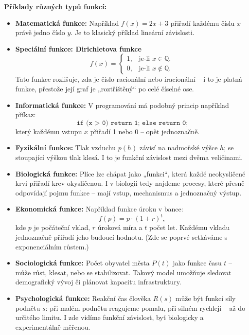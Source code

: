 \documentclass[12pt,a4paper]{article}
\begin{document}
\begin{examplebox}
\textbf{Příklady různých typů funkcí:}
\begin{itemize}
  \item \textbf{Matematická funkce:}  
  Například \(f(x) = 2x + 3\) přiřadí každému číslu \(x\) právě jedno číslo \(y\).  
  Je to klasický příklad lineární závislosti.

  \item \textbf{Speciální funkce: Dirichletova funkce}  
  \[
  f(x) = 
  \begin{cases}
  1, & \text{je-li } x \in \mathbb{Q},\\
  0, & \text{je-li } x \notin \mathbb{Q}.
  \end{cases}
  \]
  Tato funkce rozlišuje, zda je číslo racionální nebo iracionální – i to je platná funkce, přestože její graf je „roztříštěný“ po celé číselné ose.

  \item \textbf{Informatická funkce:}  
  V programování má podobný princip například příkaz:
  \[
  \texttt{if (x > 0) return 1; else return 0;}
  \]
  který každému vstupu \(x\) přiřadí 1 nebo 0 – opět jednoznačně.

  \item \textbf{Fyzikální funkce:}  
  Tlak vzduchu \(p(h)\) závisí na nadmořské výšce \(h\); se stoupající výškou tlak klesá.  
  I to je funkční závislost mezi dvěma veličinami.

  \item \textbf{Biologická funkce:}  
  Plíce lze chápat jako „funkci“, která každé neokysličené krvi přiřadí krev okysličenou.  
  I v biologii tedy najdeme procesy, které přesně odpovídají pojmu funkce – mají vstup, mechanismus a jednoznačný výstup.

  \item \textbf{Ekonomická funkce:}  
  Například funkce úroku v bance:
  \[
  f(p) = p \cdot (1 + r)^t,
  \]
  kde \(p\) je počáteční vklad, \(r\) úroková míra a \(t\) počet let.  
  Každému vkladu jednoznačně přiřadí jeho budoucí hodnotu.  
  (Zde se poprvé setkáváme s exponenciálním růstem.)

  \item \textbf{Sociologická funkce:}  
  Počet obyvatel města \(P(t)\) jako funkce času \(t\) – může růst, klesat, nebo se stabilizovat.  
  Takový model umožňuje sledovat demografický vývoj či plánovat kapacitu infrastruktury.

  \item \textbf{Psychologická funkce:}  
  Reakční čas člověka \(R(s)\) může být funkcí síly podnětu \(s\):  
  při malém podnětu reagujeme pomalu, při silném rychleji – až do určitého limitu.  
  I zde vidíme funkční závislost, byť biologicky a experimentálně měřenou.
\end{itemize}
\end{examplebox}
\end{document}
